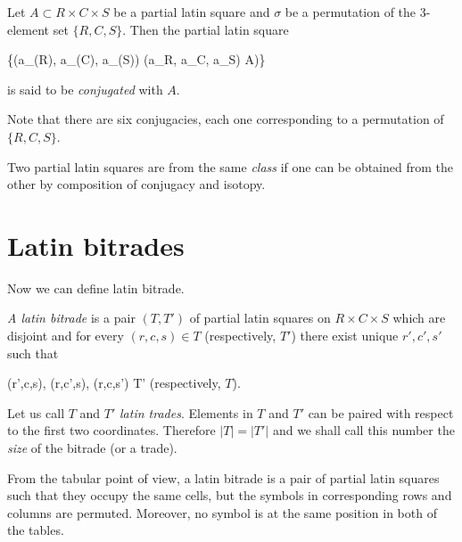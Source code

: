 \begin{defn}
Let $A \subset R \times C \times S$ be a partial latin square and $\sigma$ be a permutation of the 3-element set $\{R,C,S\}$. Then the partial latin square
\begin{cosyeqnarray}
	\{(a_{\sigma(R)}, a_{\sigma(C)}, a_{\sigma(S)}) \mid (a_R, a_C, a_S) \in A)\}
\end{cosyeqnarray}
is said to be \emph{conjugated} with $A$.
\end{defn}

Note that there are six conjugacies, each one corresponding to a permutation of $\{R,C,S\}$.

\begin{defn}
Two partial latin squares are from the same \emph{class} if one can be obtained from the other by composition of conjugacy and isotopy.
\end{defn}


\section{Latin bitrades}

Now we can define latin bitrade.

\begin{defn}
\emph{A latin bitrade} is a pair $(T, T')$ of partial latin squares on $R \times C \times S$ which are disjoint and for every $(r,c,s) \in T$ (respectively, $T'$) there exist unique $r', c', s'$ such that
\begin{cosyeqnarray}
	(r',c,s), (r,c',s), (r,c,s') \in T' \textrm{ (respectively, $T$)}.
\end{cosyeqnarray}%
Let us call $T$ and $T'$ \emph{latin trades}. Elements in $T$ and $T'$ can be paired with respect to the first two coordinates. Therefore $|T| = |T'|$ and we shall call this number the \emph{size} of the bitrade (or a trade).
\end{defn}

From the tabular point of view, a latin bitrade is a pair of partial latin squares such that they occupy the same cells, but the symbols in corresponding rows and columns are permuted. Moreover, no symbol is at the same position in both of the tables.

